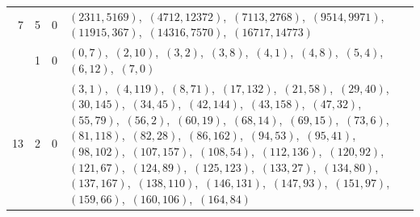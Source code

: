 \documentclass[11pt]{article}
\begin{document}
\begin{longtable}{@{}rrl>{\raggedright\arraybackslash}p{}@{}}
7 & 5 & $0$ & $(2311,5169)$,\allowbreak\ $(4712,12372)$,\allowbreak\ $(7113,2768)$,\allowbreak\ $(9514,9971)$,\allowbreak\ $(11915,367)$,\allowbreak\ $(14316,7570)$,\allowbreak\ $(16717,14773)$\\
\addlinespace[3pt]
13 & 1 & $0$ & $(0,7)$,\allowbreak\ $(2,10)$,\allowbreak\ $(3,2)$,\allowbreak\ $(3,8)$,\allowbreak\ $(4,1)$,\allowbreak\ $(4,8)$,\allowbreak\ $(5,4)$,\allowbreak\ $(6,12)$,\allowbreak\ $(7,0)$\\
13 & 2 & $0$ & $(3,1)$,\allowbreak\ $(4,119)$,\allowbreak\ $(8,71)$,\allowbreak\ $(17,132)$,\allowbreak\ $(21,58)$,\allowbreak\ $(29,40)$,\allowbreak\ $(30,145)$,\allowbreak\ $(34,45)$,\allowbreak\ $(42,144)$,\allowbreak\ $(43,158)$,\allowbreak\ $(47,32)$,\allowbreak\ $(55,79)$,\allowbreak\ $(56,2)$,\allowbreak\ $(60,19)$,\allowbreak\ $(68,14)$,\allowbreak\ $(69,15)$,\allowbreak\ $(73,6)$,\allowbreak\ $(81,118)$,\allowbreak\ $(82,28)$,\allowbreak\ $(86,162)$,\allowbreak\ $(94,53)$,\allowbreak\ $(95,41)$,\allowbreak\ $(98,102)$,\allowbreak\ $(107,157)$,\allowbreak\ $(108,54)$,\allowbreak\ $(112,136)$,\allowbreak\ $(120,92)$,\allowbreak\ $(121,67)$,\allowbreak\ $(124,89)$,\allowbreak\ $(125,123)$,\allowbreak\ $(133,27)$,\allowbreak\ $(134,80)$,\allowbreak\ $(137,167)$,\allowbreak\ $(138,110)$,\allowbreak\ $(146,131)$,\allowbreak\ $(147,93)$,\allowbreak\ $(151,97)$,\allowbreak\ $(159,66)$,\allowbreak\ $(160,106)$,\allowbreak\ $(164,84)$\\

\end{longtable}
\end{document}
